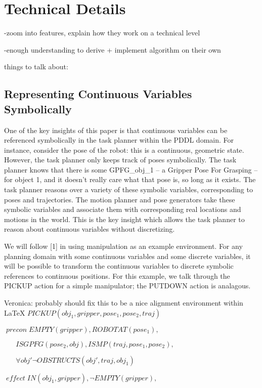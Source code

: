 \documentclass[12pt]{article}
\begin{document}
\section{Technical Details}

-zoom into features, explain how they work on a technical level

-enough understanding to derive + implement algorithm on their own

things to talk about:

\subsection{Representing Continuous Variables Symbolically}

One of the key insights of this paper is that continuous variables can be referenced symbolically in the task planner within the PDDL domain.  
For instance, consider the pose of the robot: this is a continuous, geometric state.  However, the task planner only keeps track of poses symbolically.  
The task planner knows that there is some GPFG\_obj\_1 -- a Gripper Pose For Grasping -- for object 1, and it doesn't really care what that pose is, so long as it exists.  
The task planner reasons over a variety of these symbolic variables, corresponding to poses and trajectories.  
The motion planner and pose generators take these symbolic variables and associate them with corresponding real locations and motions in the world.  
This is the key insight which allows the task planner to reason about continuous variables without discretizing.  

We will follow [1] in using manipulation as an example environment.  For any planning domain with some continuous variables and some discrete variables, it will be possible to transform the continuous variables to discrete symbolic references to continuous positions.  For this example, we talk through the PICKUP action for a simple manipulator; the PUTDOWN action is analagous.


Veronica: probably should fix this to be a nice alignment environment within LaTeX
$PICKUP(obj_1, gripper, pose_1, pose_2, traj)$

$\; precon \; EMPTY(gripper), ROBOTAT(pose_1), $

$\; \; \;\; \; \; ISGPFG(pose_2, obj), ISMP(traj, pose_1, pose_2), $

$\; \; \; \; \; \;\forall obj' \neg OBSTRUCTS(obj', traj, obj_1)$

$\; effect \; IN(obj_1, gripper), \neg EMPTY(gripper), $
\end{document}
